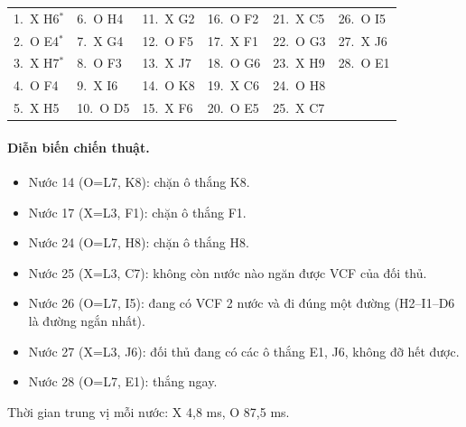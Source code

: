 {\footnotesize\linespread{1}\selectfont
\noindent\begin{tabularx}{\linewidth}{*{6}{X}}
\toprule
1.~X H6$^\ast$ & 6.~O H4 & 11.~X G2 & 16.~O F2 & 21.~X C5 & 26.~O I5 \\
2.~O E4$^\ast$ & 7.~X G4 & 12.~O F5 & 17.~X F1 & 22.~O G3 & 27.~X J6 \\
3.~X H7$^\ast$ & 8.~O F3 & 13.~X J7 & 18.~O G6 & 23.~X H9 & 28.~O E1 \\
4.~O F4 & 9.~X I6 & 14.~O K8 & 19.~X C6 & 24.~O H8 &  \\
5.~X H5 & 10.~O D5 & 15.~X F6 & 20.~O E5 & 25.~X C7 &  \\
\bottomrule
\end{tabularx}\par}
\paragraph{Diễn biến chiến thuật.}
\begin{itemize}\small
\setlength{\itemsep}{0pt}
  \item Nước 14 (O=L7, K8): chặn ô thắng K8.
  \item Nước 17 (X=L3, F1): chặn ô thắng F1.
  \item Nước 24 (O=L7, H8): chặn ô thắng H8.
  \item Nước 25 (X=L3, C7): không còn nước nào ngăn được VCF của đối thủ.
  \item Nước 26 (O=L7, I5): đang có VCF 2 nước và đi đúng một đường (H2--I1--D6 là đường ngắn nhất).
  \item Nước 27 (X=L3, J6): đối thủ đang có các ô thắng E1, J6, không đỡ hết được.
  \item Nước 28 (O=L7, E1): thắng ngay.
\end{itemize}
Thời gian trung vị mỗi nước: X 4,8 ms, O 87,5 ms.
\clearpage

